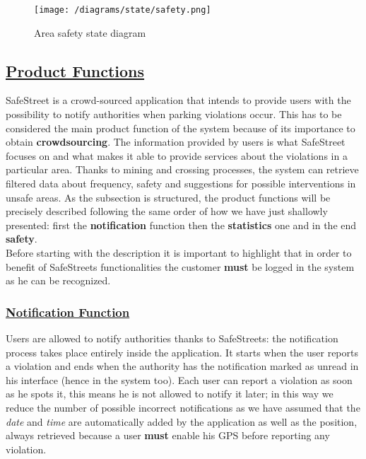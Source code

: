 			\vspace{0.3cm}
			\begin{figure}[h]
				\centering
				\texttt{[image: /diagrams/state/safety.png]}
				\caption{\label{fig:safetyState}Area safety state diagram}
			\end{figure}   

\subsection[Product Functions]{\hyperlink{toc}{Product Functions}}
	\label{sec:productFunctions}
	SafeStreet is a crowd-sourced application that intends to provide users with the possibility to notify authorities when parking violations occur. This has to be considered the main product function of the system because of its importance to obtain \textbf{crowdsourcing}. The information provided by users is what SafeStreet focuses on and what makes it able to provide services about the violations in a particular area. Thanks to mining and crossing processes, the system can retrieve filtered data about frequency, safety and suggestions for possible interventions in unsafe areas. As the subsection is structured, the product functions will be precisely described following the same order of how we have just shallowly presented: first the \textbf{notification} function then the \textbf{statistics} one and in the end \textbf{safety}. \\
	
	Before starting with the description it is important to highlight that in order to benefit of SafeStreets functionalities the customer \textbf{must} be logged in the system as he can be recognized.
	
	\subsubsection[Notification Function]{\hyperlink{toc}{Notification Function}}
		\label{sec:notificationFunction}
		Users are allowed to notify authorities thanks to SafeStreets: the notification process takes place entirely inside the application. It starts when the user reports a violation and ends when the authority has the notification marked as unread in his interface (hence in the system too). Each user can report a violation as soon as he spots it, this means he is not allowed to notify it later; in this way we reduce the number of possible incorrect notifications as we have assumed that the \emph{date} and \emph{time} are automatically added by the application as well as the position, always retrieved because a user \textbf{must} enable his GPS before reporting any violation.\\
		
